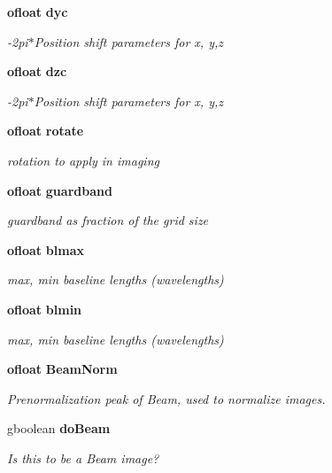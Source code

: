 \begin{CompactItemize}
{\bf ofloat} {\bf dyc}
\begin{CompactList}\small\item\em -2pi$\ast$Position shift parameters for x, y,z \item\end{CompactList}\item 
{\bf ofloat} {\bf dzc}
\begin{CompactList}\small\item\em -2pi$\ast$Position shift parameters for x, y,z \item\end{CompactList}\item 
{\bf ofloat} {\bf rotate}
\begin{CompactList}\small\item\em rotation to apply in imaging \item\end{CompactList}\item 
{\bf ofloat} {\bf guardband}
\begin{CompactList}\small\item\em guardband as fraction of the grid size \item\end{CompactList}\item 
{\bf ofloat} {\bf blmax}
\begin{CompactList}\small\item\em max, min baseline lengths (wavelengths) \item\end{CompactList}\item 
{\bf ofloat} {\bf blmin}
\begin{CompactList}\small\item\em max, min baseline lengths (wavelengths) \item\end{CompactList}\item 
{\bf ofloat} {\bf Beam\-Norm}
\begin{CompactList}\small\item\em Prenormalization peak of Beam, used to normalize images. \item\end{CompactList}\item 
gboolean {\bf do\-Beam}
\begin{CompactList}\small\item\em Is this to be a Beam image? \item\end{CompactList}\item 

\end{CompactItemize}
